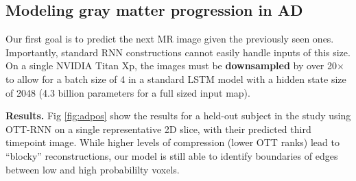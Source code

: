 \subsection{Modeling gray matter progression in AD}
Our first goal is to predict the next MR image
given the previously seen ones. Importantly, standard RNN constructions cannot easily handle inputs of this size.
On a single NVIDIA Titan Xp, the images must be \textbf{downsampled} by over 20$\times$ to allow for a
batch size of 4 in a standard LSTM model with a hidden state size of 2048 (4.3 billion parameters for a full sized input map).

\textbf{Results.}
Fig \ref{fig:adpos} show the results for a held-out subject in the study using OTT-RNN on a single representative 2D slice,
with their predicted third timepoint image. While higher levels of compression (lower OTT ranks) lead to ``blocky'' reconstructions,
our model is still able to identify boundaries of edges between low and high probabililty voxels.

